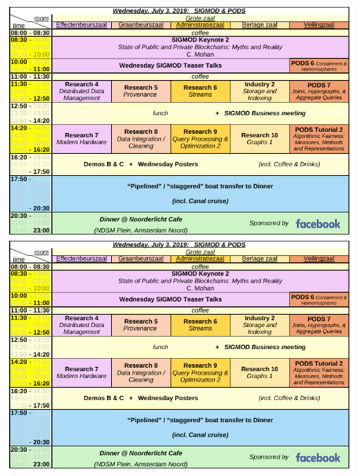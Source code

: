 \ifodd\value{page}
\includegraphics[angle=90,width=\textwidth]{schedule/p4.pdf}%
\else
\includegraphics[angle=270,width=\textwidth]{schedule/p4.pdf}%
\fi

\newpage

